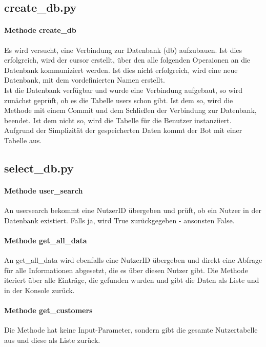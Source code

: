         \subsection{create\_db.py}
            \paragraph{Methode create\_db}
            Es wird versucht, eine Verbindung zur Datenbank (db) aufzubauen. Ist dies erfolgreich, wird der cursor erstellt, über den alle folgenden Operaionen an die Datenbank kommuniziert werden. Ist dies nicht erfolgreich, wird eine neue Datenbank, mit dem vordefinierten Namen erstellt.\\
            Ist die Datenbank verfügbar und wurde eine Verbindung aufgebaut, so wird zunächst geprüft, ob es die Tabelle users schon gibt. Ist dem so, wird die Methode mit einem Commit und dem Schließen der Verbindung zur Datenbank, beendet. Ist dem nicht so, wird die Tabelle für die Benutzer instanziiert. Aufgrund der Simplizität der gespeicherten Daten kommt der Bot mit einer Tabelle aus.


        \subsection{select\_db.py}

            \paragraph{Methode user\_search}
                An user\-search bekommt eine Nutzer\-ID übergeben und prüft, ob ein Nutzer in der Datenbank existiert. Falls ja, wird True zurückgegeben - ansonsten False.

            \paragraph{Methode get\_all\_data}
                An get\_all\_data wird ebenfalls eine Nutzer\-ID übergeben und direkt eine Abfrage für alle Informationen abgesetzt, die es über diesen Nutzer gibt. Die Methode iteriert über alle Einträge, die gefunden wurden und gibt die Daten als Liste und in der Konsole zurück.
                
            \paragraph{Methode get\_customers}
                Die Methode hat keine Input-Parameter, sondern gibt die gesamte Nutzertabelle aus und diese als Liste zurück.

